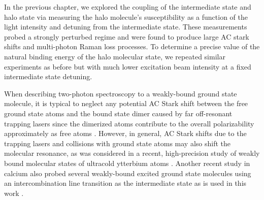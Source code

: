 
In the previous chapter, we explored the coupling of the intermediate state and halo state via measuring the halo molecule's susceptibility as a function of the light intensity and detuning from the intermediate state.
These measurements probed a strongly perturbed regime and were found to produce large AC stark shifts and multi-photon Raman loss processes. 
To determine a precise value of the natural binding energy of the halo molecular state, we repeated similar experiments as before but with much lower excitation beam intensity at a fixed intermediate state detuning.

When describing two-photon spectroscopy to a weakly-bound ground state molecule, it is typical to neglect any potential AC Stark shift between the free ground state atoms and the bound state dimer caused by far off-resonant trapping lasers since the dimerized atoms contribute to the overall polarizability approximately as free atoms \cite{Jones2006}.
However, in general, AC Stark shifts due to the trapping lasers and collisions with ground state atoms may also shift the molecular resonance, as was considered in a recent, high-precision study of weakly bound molecular states of ultracold ytterbium atoms \cite{bbc17}.
Another recent study in calcium also probed several weakly-bound excited ground state molecules using an intercombination line transition as the intermediate state as is used in this work \cite{Pachomow2017a}.

